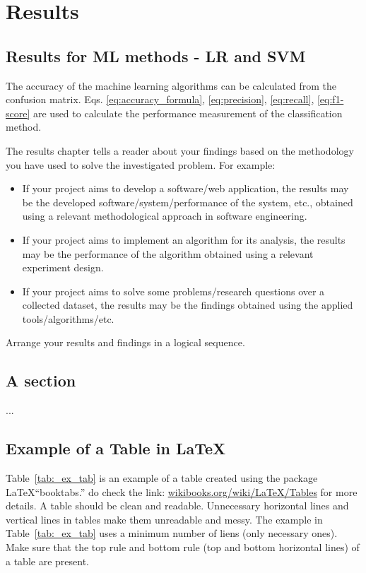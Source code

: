 \chapter{Results}
\label{ch:results}
\section{Results for ML methods - LR and SVM}
The accuracy of the machine learning algorithms can be calculated from the confusion matrix. Eqs. \ref{eq:accuracy_formula}, \ref{eq:precision}, \ref{eq:recall}, \ref{eq:f1-score} are used to calculate the performance measurement of the classification method.

The results chapter tells a reader about your findings based on the methodology you have used to solve the investigated problem. For example: 
\begin{itemize}
    \item If your project aims to develop a software/web application, the results may be the developed software/system/performance of the system, etc., obtained using a relevant methodological approach in software engineering. 
    
    \item If your project aims to implement an algorithm for its analysis, the results may be the performance of the algorithm obtained using a relevant experiment design. 
    
    \item If your project aims to solve some problems/research questions over a collected dataset, the results may be the findings obtained using the applied tools/algorithms/etc. 
\end{itemize}
Arrange your results and findings in a logical sequence. 



\section{A section}

...

\clearpage
\section{Example of a Table in \LaTeX}
Table~\ref{tab:_ex_tab} is an example of a table created using the package \LaTeX  ``booktabs.'' do check the link: \href{https://en.wikibooks.org/wiki/LaTeX/Tables}{wikibooks.org/wiki/LaTeX/Tables} for more details. A table should be clean and readable. Unnecessary horizontal lines and vertical lines in tables make them unreadable and messy. The example in Table~\ref{tab:_ex_tab} uses a minimum number of liens (only necessary ones). Make sure that the top rule and bottom rule (top and bottom horizontal lines) of a table are present. 

